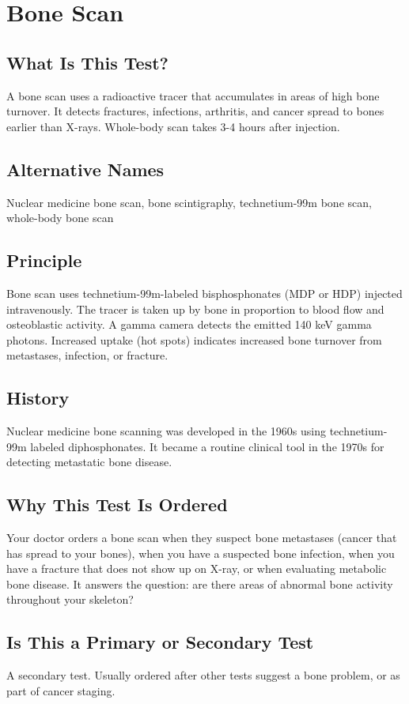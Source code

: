 \chapter{Bone Scan}

\section*{What Is This Test?}
A bone scan uses a radioactive tracer that accumulates in areas of high bone turnover. It detects fractures, infections, arthritis, and cancer spread to bones earlier than X-rays. Whole-body scan takes 3-4 hours after injection.

\section*{Alternative Names}
Nuclear medicine bone scan, bone scintigraphy, technetium-99m bone scan, whole-body bone scan


\section*{Principle}
Bone scan uses technetium-99m-labeled bisphosphonates (MDP or HDP) injected intravenously. The tracer is taken up by bone in proportion to blood flow and osteoblastic activity. A gamma camera detects the emitted 140 keV gamma photons. Increased uptake (hot spots) indicates increased bone turnover from metastases, infection, or fracture.

\section*{History}
Nuclear medicine bone scanning was developed in the 1960s using technetium-99m labeled diphosphonates. It became a routine clinical tool in the 1970s for detecting metastatic bone disease.

\section*{Why This Test Is Ordered}
Your doctor orders a bone scan when they suspect bone metastases (cancer that has spread to your bones), when you have a suspected bone infection, when you have a fracture that does not show up on X-ray, or when evaluating metabolic bone disease. It answers the question: are there areas of abnormal bone activity throughout your skeleton?

\section*{Is This a Primary or Secondary Test}
A secondary test. Usually ordered after other tests suggest a bone problem, or as part of cancer staging.

